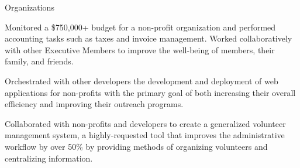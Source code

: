\documentclass{resume} %
\begin{document}

\begin{workSection}{Organizations}
    \customItem[
        title=Delta Chi Fraternity,
        keyHighlight=Treasurer{,} Technology Chair,
        duration=August 2021 - Present,
        location=Atlanta{,} GA
    ]
    \begin{bullets}
        \item Monitored a \$750,000+ budget for a non-profit organization and performed accounting tasks such as taxes and invoice management. Worked collaboratively with other Executive Members to improve the well-being of members, their family, and friends.
    \end{bullets}

    \customItem[
        title=Bits of Good,
        keyHighlight=Developer,
        duration=January 2023 - May 2024,
        location=Atlanta{,} GA
    ]
     \begin{bullets}
       \item Orchestrated with other developers the development and deployment of web applications for non-profits with the primary goal of both increasing their overall efficiency and improving their outreach programs.
       \item Collaborated with non-profits and developers to create a generalized volunteer management system, a highly-requested tool that improves the administrative workflow by over 50\% by providing methods of organizing volunteers and centralizing information.

     \end{bullets}
     
\end{workSection}
\end{document}
